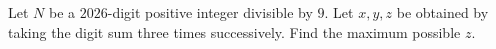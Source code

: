 Let $N$ be a $2026$-digit positive integer divisible by $9$. Let $x,y,z$ be obtained by taking the digit sum three times successively. Find the maximum possible $z$.
